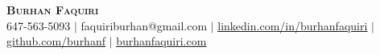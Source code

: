 \begin{center}
    \textbf{\Huge \scshape Burhan Faquiri} \\ \vspace{1pt}
    \small 647-563-5093 $|$ {faquiriburhan@gmail.com} $|$ 
    \href{https://www.linkedin.com/in/burhanfaquiri}{\underline{linkedin.com/in/burhanfaquiri}} $|$ 
    \href{https://github.com/burhanf}{\underline{github.com/burhanf}} $|$
    \href{https://www.burhanfaquiri.com}{\underline{burhanfaquiri.com}}
\end{center}
